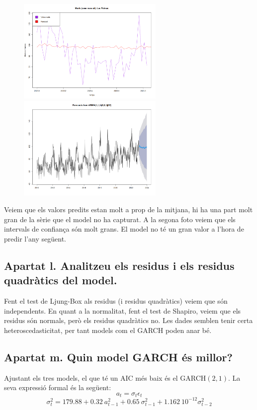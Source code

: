 \documentclass[a4paper, 11pt]{article}
\begin{document}
\begin{figure}[H]
  \centering
  \includegraphics[width=7cm]{assets/comp-forecast.png}
  \includegraphics[width=7cm]{assets/forecast.png}
\end{figure}

Veiem que els valors predits estan molt a prop de la mitjana, hi ha una part molt gran de la sèrie que el model no ha
capturat. A la segona foto veiem que els intervals de confiança són molt grans. El model no té un gran valor a l'hora
de predir l'any següent.

\subsection*{Apartat l. Analitzeu els residus i els residus quadràtics del model.}

Fent el test de Ljung-Box als residus (i residus quadràtics) veiem que són independents. En quant a la normalitat, fent
el test de Shapiro, veiem que els residus són normals, però els residus quadràtics no. Les dades semblen tenir certa
heteroscedasticitat, per tant models com el GARCH poden anar bé.

\subsection*{Apartat m. Quin model GARCH és millor?}

Ajustant els tres models, el que té un AIC més baix és el GARCH$(2, 1)$. La seva expressió formal és la següent:
\[
  a_t = \sigma_t\epsilon_t
\]
\[
  \sigma^2_t = 179.88 + 0.32 \ a^2_{t-1} + 0.65 \ \sigma^2_{t-1} + 1.162 \ 10^{-12} \sigma^2_{t-2}
\]
\end{document}
